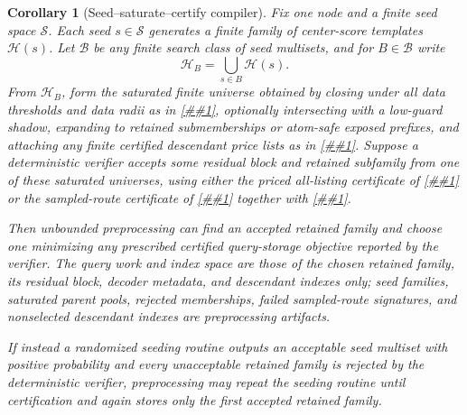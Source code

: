 \documentclass[10pt]{article}
\newcommand{\cref}[1]{\ref{##1}}
\newtheorem{corollary}[theorem]{Corollary}
\theoremstyle{definition}
\begin{document}
\begin{corollary}[Seed--saturate--certify compiler]
   \label{cor:seed-saturate-certify}
   Fix one node and a finite seed space $\mathcal S$.  Each seed
   $s\in\mathcal S$ generates a finite family of center-score templates
   \(\mathcal H(s)\).  Let $\mathcal B$ be any finite search class of seed
   multisets, and for $B\in\mathcal B$ write
   \[
      \mathcal H_B=\bigcup_{s\in B}\mathcal H(s).
   \]
   From $\mathcal H_B$, form the saturated finite universe obtained by closing
   under all data thresholds and data radii as in
   \cref{cor:offline-center-score-saturation}, optionally intersecting with a
   low-guard shadow, expanding to retained submemberships or atom-safe exposed
   prefixes, and attaching any finite certified descendant price lists as in
   \cref{cor:offline-recursive-pareto-pricing}.  Suppose a deterministic
   verifier accepts some residual block and retained subfamily from one of
   these saturated universes, using either the priced all-listing certificate of
   \cref{lem:priced-cover-compiler} or the sampled-route certificate of
   \cref{lem:sampled-priced-cover} together with
   \cref{lem:finite-sampled-route-verifier}.

   Then unbounded preprocessing can find an accepted retained family and choose
   one minimizing any prescribed certified query-storage objective reported by
   the verifier.  The query work and index space are those of the chosen
   retained family, its residual block, decoder metadata, and descendant
   indexes only; seed families, saturated parent pools, rejected memberships,
   failed sampled-route signatures, and nonselected descendant indexes are
   preprocessing artifacts.

   If instead a randomized seeding routine outputs an acceptable seed multiset
   with positive probability and every unacceptable retained family is rejected
   by the deterministic verifier, preprocessing may repeat the seeding routine
   until certification and again stores only the first accepted retained family.
\end{corollary}
\end{document}
